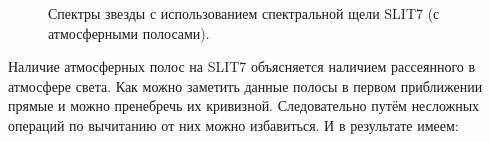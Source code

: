 \documentclass[a4paper]{article}
\begin{document}
\begin{figure}[h]
\begin{minipage}[h]{0.50\linewidth}
\end{minipage}
\caption{Спектры звезды с использованием спектральной щели SLIT7 (с атмосферными полосами).}
\label{ris:image2}
\end{figure}

Наличие атмосферных полос на SLIT7 объясняется наличием рассеянного в атмосфере света. Как можно заметить данные полосы в первом приближении прямые и можно пренебречь их кривизной. Следовательно путём несложных операций по вычитанию от них можно избавиться. И в результате имеем:

\begin{figure}[h]
\begin{minipage}[h]{0.50\linewidth}
\end{minipage}
\begin{minipage}[h]{0.50\linewidth}
\end{minipage}
\begin{minipage}[h]{0.50\linewidth}

\end{minipage}
\end{figure}
\end{document}
